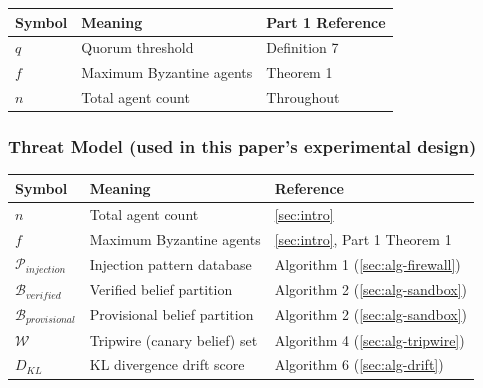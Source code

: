 \documentclass[
]{article}
\newcounter{none} %
\begin{document}
{\def\LTcaptype{none} %
\begin{longtable}[]{@{}lll@{}}
\toprule\noalign{}
Symbol & Meaning & Part 1 Reference \\
\midrule\noalign{}
\endhead
\bottomrule\noalign{}
\endlastfoot
\(q\) & Quorum threshold & Definition 7 \\
\(f\) & Maximum Byzantine agents & Theorem 1 \\
\(n\) & Total agent count & Throughout \\
\end{longtable}
}

\subsubsection{Threat Model (used in this paper's experimental
design)}\label{threat-model-used-in-this-papers-experimental-design}

{\def\LTcaptype{none} %
\begin{longtable}[]{@{}
  >{\raggedright\arraybackslash}p{}
  >{\raggedright\arraybackslash}p{}
  >{\raggedright\arraybackslash}p{}@{}}
\toprule\noalign{}
\begin{minipage}[b]{\linewidth}\raggedright
Symbol
\end{minipage} & \begin{minipage}[b]{\linewidth}\raggedright
Meaning
\end{minipage} & \begin{minipage}[b]{\linewidth}\raggedright
Reference
\end{minipage} \\
\midrule\noalign{}
\endhead
\bottomrule\noalign{}
\endlastfoot
\(n\) & Total agent count & \cref{sec:intro} \\
\(f\) & Maximum Byzantine agents & \cref{sec:intro}, Part 1 Theorem 1 \\
\(\mathcal{P}_{injection}\) & Injection pattern database & Algorithm 1
(\cref{sec:alg-firewall}) \\
\(\mathcal{B}_{verified}\) & Verified belief partition & Algorithm 2
(\cref{sec:alg-sandbox}) \\
\(\mathcal{B}_{provisional}\) & Provisional belief partition & Algorithm
2 (\cref{sec:alg-sandbox}) \\
\(\mathcal{W}\) & Tripwire (canary belief) set & Algorithm 4
(\cref{sec:alg-tripwire}) \\
\(D_{KL}\) & KL divergence drift score & Algorithm 6
(\cref{sec:alg-drift}) \\
\end{longtable}
}
\end{document}
